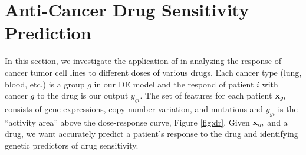 \section{Anti-Cancer Drug Sensitivity Prediction}
\label{realexp}
In this section, we investigate the application of \dc{} in analyzing the response of cancer tumor cell lines to different doses of various drugs. 
Each cancer type (lung, blood, etc.) is a group $g$ in our DE model and the respond of patient $i$ with cancer $g$ to the drug is our output $y_{gi}$. 
The set of features for each patient $\mathbf{x}_{gi}$ consists of gene expressions, copy number variation, and mutations and $y_{gi}$ is the ``activity area'' above the dose-response curve, Figure \ref{fig:dr}.
Given $\mathbf{x}_{gi}$ and a drug, we want accurately predict a patient's response to the drug and identifying genetic predictors of drug sensitivity. 
